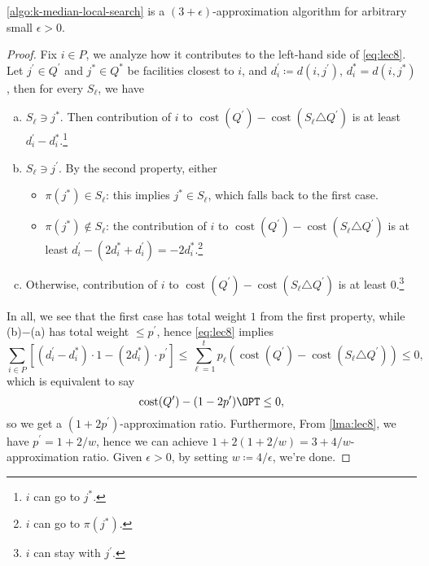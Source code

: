 \begin{theorem}\label{thm:lec8}
	\autoref{algo:k-median-local-search} is a \((3 + \epsilon)\)-approximation algorithm for arbitrary small \(\epsilon > 0\).
\end{theorem}
\begin{proof}
	Fix \(i\in P\), we analyze how it contributes to the left-hand side of \autoref{eq:lec8}. Let \(j^\prime \in Q^\prime \) and \(j^{\ast} \in Q^{\ast} \) be facilities closest to \(i\), and \(d_i^\prime \coloneqq d(i, j^\prime )\), \(d_i^{\ast} = d(i, j^{\ast} )\), then for every \(S_{\ell}\), we have
	\begin{enumerate}[(a)]
		\item \(S_{\ell }\ni j^{\ast} \). Then contribution of \(i\) to \(\mathop{\mathrm{cost}}(Q^\prime ) - \mathop{\mathrm{cost}}(S_{\ell }\triangle Q^\prime)\) is at least \(d_i^\prime - d_i^{\ast}\).\footnote{\(i\) can go to \(j^{\ast} \).}
		\item \(S_{\ell }\ni j^\prime\). By the second property, either
		      \begin{itemize}
			      \item \(\pi (j^{\ast} )\in S_{\ell } \): this implies \(j^{\ast}\in S_{\ell }\), which falls back to the first case.
			      \item \(\pi (j^{\ast} )\notin S_{\ell } \): the contribution of \(i\) to \(\mathop{\mathrm{cost}}(Q^\prime ) - \mathop{\mathrm{cost}}(S_{\ell }\triangle Q^\prime)\) is at least \(d_i^\prime - (2d_i^{\ast} + d_i^\prime ) = -2d_i^{\ast}\).\footnote{\(i\) can go to \(\pi (j^{\ast} )\).}
		      \end{itemize}
		\item Otherwise, contribution of \(i\) to \(\mathop{\mathrm{cost}}(Q^\prime ) - \mathop{\mathrm{cost}}(S_{\ell }\triangle Q^\prime)\) is at least \(0\).\footnote{\(i\) can stay with \(j^\prime \).}
	\end{enumerate}

	In all, we see that the first case has total weight \(1\) from the first property, while (b)\(-\)(a) has total weight \(\leq p^\prime \), hence \autoref{eq:lec8} implies
	\[
		\sum_{i\in P} \left[ (d_i^\prime - d_i^{\ast} )\cdot 1 - (2d_i^{\ast} )\cdot p^\prime \right] \leq \sum_{\ell =1} ^t p_{\ell } (\mathop{\mathrm{cost}}(Q^\prime ) - \mathop{\mathrm{cost}}(S_{\ell }\triangle Q^\prime)) \leq 0,
	\]
	which is equivalent to say
	\[
		\mathop{\mathrm{cost}}(Q^\prime ) - (1 - 2p^\prime )\OPT \leq 0,
	\]
	so we get a \((1 + 2p^\prime )\)-approximation ratio. Furthermore, From \autoref{lma:lec8}, we have \(p^\prime = 1 + 2 / w\), hence we can achieve \(1 + 2(1 + 2 / w) = 3 + 4 / w\)-approximation ratio. Given \(\epsilon > 0\), by setting \(w \coloneqq 4/\epsilon \), we're done.
\end{proof}